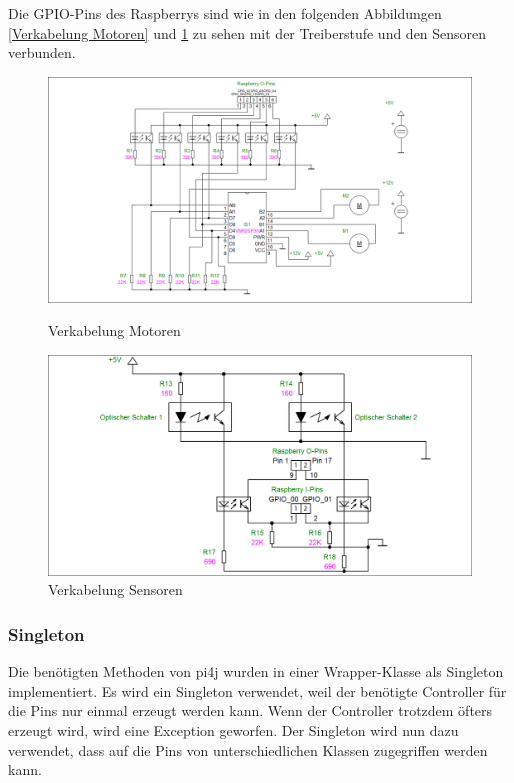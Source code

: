 \vspace{10pt}

Die GPIO-Pins des Raspberrys sind wie in den folgenden Abbildungen \ref{Verkabelung Motoren} und \ref{Verkabelung Sensoren} zu sehen mit der Treiberstufe und den Sensoren verbunden.
\begin{figure}[H]
  \begin{minipage}[hbt]{0.5\textwidth}
    \includegraphics[width=1\textwidth]{Bilder/RaspberryPinVerkabelung/Motoransteuerung}
 	\caption{Verkabelung Motoren}
  	\label{Verkabelung Motoren}
  \end{minipage}
\hspace{.03\linewidth}
  \begin{minipage}[hbt]{0.5\textwidth}
    \includegraphics[width=1\textwidth]{Bilder/RaspberryPinVerkabelung/Sensoransteuerung}
  	\caption{Verkabelung Sensoren}
  	\label{Verkabelung Sensoren}
  \end{minipage}
  \vspace{0pt}
\end{figure}

\subsubsection{Singleton}
Die benötigten Methoden von pi4j wurden in einer Wrapper-Klasse als Singleton implementiert. Es wird ein Singleton verwendet, weil der benötigte Controller für die Pins nur einmal erzeugt werden kann. Wenn der Controller trotzdem öfters erzeugt wird, wird  eine Exception geworfen. Der Singleton wird nun dazu verwendet, dass auf die Pins von unterschiedlichen Klassen zugegriffen werden kann.

